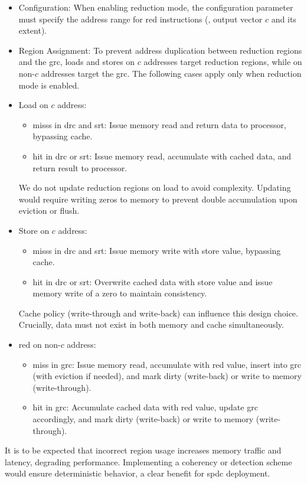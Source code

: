 \begin{itemize}
    \item Configuration: When enabling \gls{reduction} mode, the configuration parameter must specify the address range for \acrshort{red} instructions (\eg, output vector $c$ and its extent).
    \item Region Assignment: To prevent address duplication between \gls{reduction} regions and the \acrshort{grc}, loads and stores on $c$ addresses target \gls{reduction} regions, while  on non-$c$ addresses target the \acrshort{grc}.
    The following cases apply only when \gls{reduction} mode is enabled.
    \item Load on $c$ address:
    \begin{itemize}
        \item \Glspl{miss} in \acrshort{drc} and \acrshort{srt}: Issue memory read and return data to processor, bypassing cache.
        \item \Gls{hit} in \acrshort{drc} or \acrshort{srt}: Issue memory read, accumulate with cached data, and return result to processor.
    \end{itemize}
    We do not update \gls{reduction} regions on load to avoid complexity.
    Updating would require writing zeros to memory to prevent double accumulation upon \gls{eviction} or flush.
    \item Store on $c$ address:
    \begin{itemize}
        \item \Glspl{miss} in \acrshort{drc} and \acrshort{srt}: Issue memory write with store value, bypassing cache.
        \item \Gls{hit} in \acrshort{drc} or \acrshort{srt}: Overwrite cached data with store value and issue memory write of a zero to maintain consistency.
    \end{itemize}
    Cache policy (write-through and write-back) can influence this design choice.
    Crucially, data must not exist in both memory and cache simultaneously.
    \item \acrshort{red} on non-$c$ address:
    \begin{itemize}
        \item \Gls{miss} in \acrshort{grc}: Issue memory read, accumulate with \acrshort{red} value, insert into \acrshort{grc} (with \gls{eviction} if needed), and mark dirty (write-back) or write to memory (write-through).
        \item \Gls{hit} in \acrshort{grc}: Accumulate cached data with \acrshort{red} value, update \acrshort{grc} accordingly, and mark dirty (write-back) or write to memory (write-through).
    \end{itemize}
\end{itemize}
It is to be expected that incorrect region usage increases memory traffic and latency, degrading performance.
Implementing a coherency or detection scheme would ensure deterministic behavior, a clear benefit for \acrlong{spdc} deployment.

